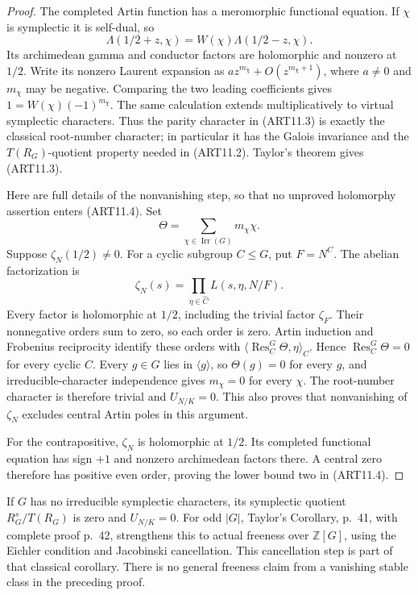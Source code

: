 \begin{proof}
The completed Artin function has a meromorphic functional
equation. If $\chi$ is symplectic it is self-dual, so
\[
 \Lambda(1/2+z,\chi)=W(\chi)\Lambda(1/2-z,\chi).
\]
Its archimedean gamma and conductor factors are holomorphic
and nonzero at $1/2$. Write its nonzero Laurent expansion as
$a z^{m_\chi}+O(z^{m_\chi+1})$, where $a\ne0$ and
$m_\chi$ may be negative. Comparing the two leading
coefficients gives $1=W(\chi)(-1)^{m_\chi}$.
The same calculation extends multiplicatively to virtual
symplectic characters. Thus the parity character in
(ART11.3) is exactly the classical root-number character;
in particular it has the Galois invariance and the
$T(R_G)$-quotient property needed in (ART11.2).
Taylor's theorem gives (ART11.3).

Here are full details of the nonvanishing step, so that no
unproved holomorphy assertion enters (ART11.4). Set
\[
             \Theta=\sum_{\chi\in\operatorname{Irr}(G)}
                         m_\chi\chi.
\]
Suppose $\zeta_N(1/2)\ne0$. For a cyclic subgroup
$C\le G$, put $F=N^C$. The abelian factorization is
\[
       \zeta_N(s)=\prod_{\eta\in\widehat C}
                       L(s,\eta,N/F).
\]
Every factor is holomorphic at $1/2$, including the trivial
factor $\zeta_F$. Their nonnegative orders sum to zero,
so each order is zero. Artin induction and Frobenius
reciprocity identify these orders with
$\langle\operatorname{Res}^G_C\Theta,\eta\rangle_C$.
Hence $\operatorname{Res}^G_C\Theta=0$ for every cyclic
$C$. Every $g\in G$ lies in $\langle g\rangle$, so
$\Theta(g)=0$ for every $g$, and irreducible-character
independence gives $m_\chi=0$ for every $\chi$.
The root-number character is therefore trivial and
$U_{N/K}=0$. This also proves that nonvanishing of
$\zeta_N$ excludes central Artin poles in this argument.

For the contrapositive, $\zeta_N$ is holomorphic at $1/2$.
Its completed functional equation has sign $+1$ and
nonzero archimedean factors there. A central zero
therefore has positive even order, proving the lower
bound two in (ART11.4).
\end{proof}

If $G$ has no irreducible symplectic characters, its
symplectic quotient $R_G^s/T(R_G)$ is zero and $U_{N/K}=0$.
For odd $|G|$, Taylor's Corollary, p.~41, with complete
proof p.~42, strengthens this to actual freeness over
$\mathbb Z[G]$, using the Eichler condition and Jacobinski
cancellation. This cancellation step is part of that
classical corollary. There is no general freeness claim
from a vanishing stable class in the preceding proof.

